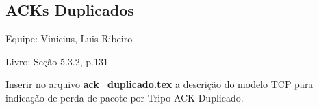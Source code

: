 \subsection{ACKs Duplicados}
Equipe: Vinicius, Luis Ribeiro

Livro: Seção 5.3.2, p.131

Inserir no arquivo \textbf{ack\_duplicado.tex} a descrição do modelo TCP para indicação de perda de 
pacote por Tripo ACK Duplicado.

